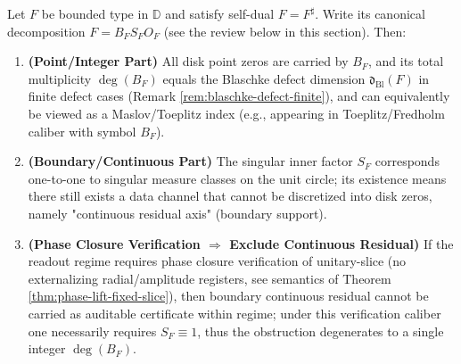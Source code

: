 \begin{proposition}\label{prop:selfdual-maslov-singular-dichotomy}
Let \(F\) be bounded type in \(\mathbb{D}\) and satisfy self-dual \(F=F^\sharp\).
Write its canonical decomposition \(F=B_F S_F O_F\) (see the review below in this section).
Then:
\begin{enumerate}
  \item \textbf{(Point/Integer Part)} All disk point zeros are carried by \(B_F\), and its total multiplicity \(\deg(B_F)\) equals the Blaschke defect dimension \(\mathfrak d_{\mathrm{Bl}}(F)\) in finite defect cases (Remark \ref{rem:blaschke-defect-finite}), and can equivalently be viewed as a Maslov/Toeplitz index (e.g., appearing in Toeplitz/Fredholm caliber with symbol \(B_F\)).
  \item \textbf{(Boundary/Continuous Part)} The singular inner factor \(S_F\) corresponds one-to-one to singular measure classes on the unit circle; its existence means there still exists a data channel that cannot be discretized into disk zeros, namely "continuous residual axis" (boundary support).
  \item \textbf{(Phase Closure Verification \(\Rightarrow\) Exclude Continuous Residual)} If the readout regime requires phase closure verification of unitary-slice (no externalizing radial/amplitude registers, see semantics of Theorem \ref{thm:phase-lift-fixed-slice}), then boundary continuous residual cannot be carried as auditable certificate within regime; under this verification caliber one necessarily requires \(S_F\equiv 1\), thus the obstruction degenerates to a single integer \(\deg(B_F)\).
\end{enumerate}
\end{proposition}

